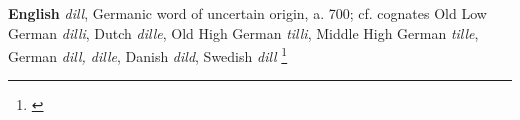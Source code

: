 \begin{etymology}\label{ety:dill}
\textbf{English} \textit{dill}, Germanic word of uncertain origin, a. 700; cf. cognates  Old Low German \textit{dilli}, Dutch \textit{dille}, Old High German \textit{tilli}, Middle High German \textit{tille}, German \textit{dill, dille}, Danish \textit{dild}, Swedish \textit{dill} \footnote{\textcite[s.v. dill]{oed}}
\end{etymology}